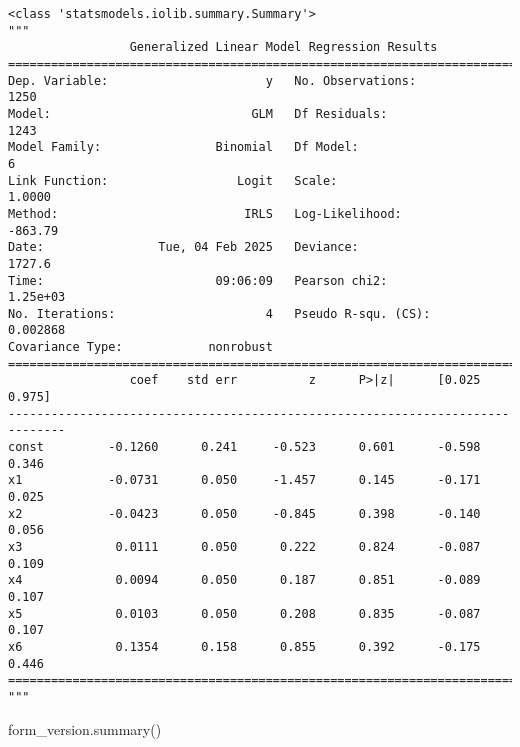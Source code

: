 \documentclass[
  letterpaper,
  DIV=11,
  numbers=noendperiod]{scrreprt}
\newenvironment{Shaded}{\begin{snugshade}}{\end{snugshade}}
\newcommand{\NormalTok}[1]{\textcolor[rgb]{0.00,0.23,0.31}{#1}}
\begin{document}
\begin{verbatim}
<class 'statsmodels.iolib.summary.Summary'>
"""
                 Generalized Linear Model Regression Results                  
==============================================================================
Dep. Variable:                      y   No. Observations:                 1250
Model:                            GLM   Df Residuals:                     1243
Model Family:                Binomial   Df Model:                            6
Link Function:                  Logit   Scale:                          1.0000
Method:                          IRLS   Log-Likelihood:                -863.79
Date:                Tue, 04 Feb 2025   Deviance:                       1727.6
Time:                        09:06:09   Pearson chi2:                 1.25e+03
No. Iterations:                     4   Pseudo R-squ. (CS):           0.002868
Covariance Type:            nonrobust                                         
==============================================================================
                 coef    std err          z      P>|z|      [0.025      0.975]
------------------------------------------------------------------------------
const         -0.1260      0.241     -0.523      0.601      -0.598       0.346
x1            -0.0731      0.050     -1.457      0.145      -0.171       0.025
x2            -0.0423      0.050     -0.845      0.398      -0.140       0.056
x3             0.0111      0.050      0.222      0.824      -0.087       0.109
x4             0.0094      0.050      0.187      0.851      -0.089       0.107
x5             0.0103      0.050      0.208      0.835      -0.087       0.107
x6             0.1354      0.158      0.855      0.392      -0.175       0.446
==============================================================================
"""
\end{verbatim}

\begin{Shaded}
\begin{Highlighting}[]
\NormalTok{form\_version.summary()}
\end{Highlighting}
\end{Shaded}
\end{document}

